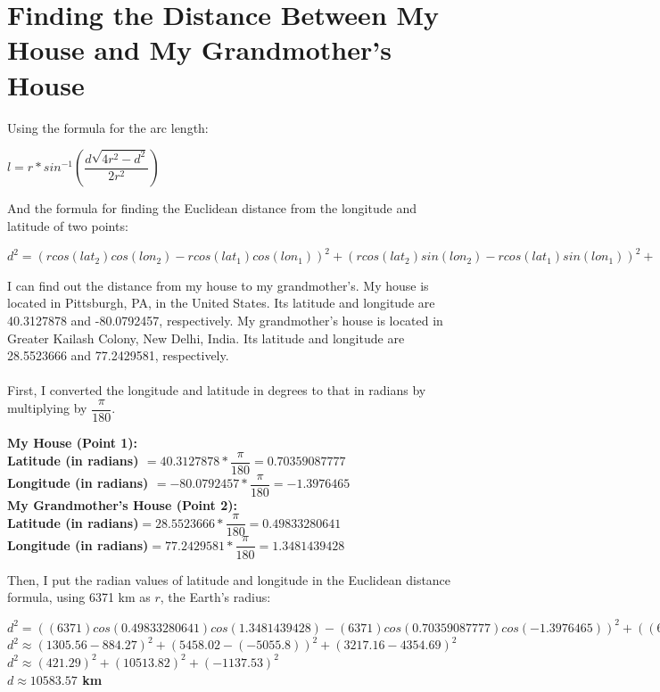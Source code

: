 \documentclass[a4paper]{article}
\begin{document}
\section{Finding the Distance Between My House and My Grandmother's House}
Using the formula for the arc length: 
\begin{center}
\textbf{$l = r * sin^{-1}\left(\dfrac{d\sqrt{4r^2-d^2}}{2r^2}\right)$}\\
\end{center}
And the formula for finding the Euclidean distance from the longitude and latitude of two points: 
\begin{center}
\textbf{$d^{2} = (rcos(lat_2)cos(lon_2)-rcos(lat_1)cos(lon_1))^{2} + (rcos(lat_2)sin(lon_2)-rcos(lat_1)sin(lon_1))^{2} + (rsin(lat_2) -rsin(lat_1))^{2}$}
\end{center}

I can find out the distance from my house to my grandmother's. My house is located in Pittsburgh, PA, in the United States. Its latitude and longitude are 40.3127878 and -80.0792457, respectively. My grandmother's house is located in Greater Kailash Colony, New Delhi, India. Its latitude and longitude are 28.5523666 and 77.2429581, respectively. 
\\\\
First, I converted the longitude and latitude in degrees to that in radians by multiplying by $\dfrac{\pi}{180}$. 

\begin{center}
\textbf{My House (Point 1):}\\ 
\medskip
\textbf{Latitude (in radians) $= 40.3127878 * \dfrac{\pi}{180} = 0.70359087777$}\\
\medskip
\textbf{Longitude (in radians) $= -80.0792457 * \dfrac{\pi}{180}= -1.3976465$}\\ 
\medskip
\textbf{My Grandmother's House (Point 2):}\\
\bigskip
\textbf{Latitude (in radians)$ = 28.5523666 * \dfrac{\pi}{180}=0.49833280641$}\\
\medskip
\textbf{Longitude (in radians)$ = 77.2429581 * \dfrac{\pi}{180}=1.3481439428$}\\ 
\end{center}

Then, I put the radian values of latitude and longitude in the Euclidean distance formula, using 6371 km as $r$, the Earth's radius:

\begin{center}
\textbf{$d^{2} = ((6371)cos(0.49833280641)cos(1.3481439428)-(6371)cos(0.70359087777)cos(-1.3976465))^{2} + ((6371)cos(0.49833280641)sin(1.3481439428)-(6371)cos(0.70359087777)sin(-1.3976465))^{2} + ((6371)sin(0.49833280641) -(6371)sin(0.70359087777))^{2}$}\\
\medskip
\textbf{$d^2 \approx (1305.56-884.27)^2 + (5458.02-(-5055.8))^2 +(3217.16-4354.69)^2 $}\\
\medskip
\textbf{$d^2 \approx (421.29)^2 + (10513.82)^2 + (-1137.53)^2$}\\
\medskip
\textbf{$d \approx 10583.57  $ km}
\end{center}
\end{document}
